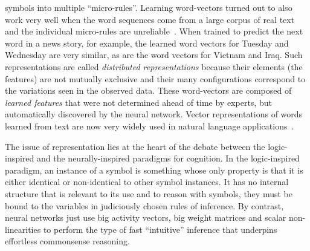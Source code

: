 \documentclass[10pts]{article}
\begin{document}
symbols into multiple ``micro-rules''.  
%
Learning word-vectors turned out to also
work very well when the word sequences come from a large corpus of
real text and the individual micro-rules are
unreliable~\citep{BenDucVin01-short}. When trained to predict the next
word in a news story, for example, the learned word vectors for
Tuesday and Wednesday are very similar, as are the word vectors for
Vietnam and Iraq. 
Such representations are called {\em
  distributed representations} because their elements (the features) are
not mutually exclusive and their many configurations
correspond to
the variations seen in the observed data.  These word-vectors are
composed of
{\em learned features} that were not determined ahead of time by
experts, but automatically discovered by the neural network.  Vector
representations of words learned from text are now very widely used in
natural language
applications~\citep{Schwenk-2007,collobert:2011b,Socher-2011,
  Mikolov-et-al-NIPS2013,Bahdanau-et-al-ICLR2015-small,Sutskever-et-al-NIPS2014}.

The issue of representation lies at the heart of the debate between
the logic-inspired and the neurally-inspired paradigms for
cognition. In the logic-inspired paradigm, an instance of a symbol is
something whose only property is that it is either identical or
non-identical to other symbol instances. It has no internal structure
that is relevant to its use and  to reason with symbols, they must be
bound to the variables in judiciously chosen rules of inference.  By
contrast, neural networks just use big activity vectors, big weight
matrices and scalar non-linearities to perform the type of fast
``intuitive'' inference that underpins effortless commonsense
reasoning.
\end{document}
